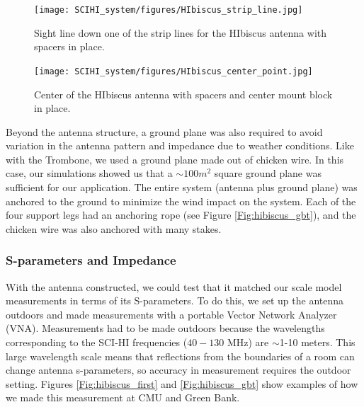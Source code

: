 \begin{figure}[htb]
\centering
\begin{minipage}[b]{0.52\textwidth}
\centering
\texttt{[image: SCIHI\_system/figures/HIbiscus\_strip\_line.jpg]}
\caption{Sight line down one of the strip lines for the HIbiscus antenna with spacers in place.}
\label{Fig:hibiscus_spacer}
\end{minipage}%
\begin{minipage}[b]{0.02\textwidth}
\hspace{1cm}
\end{minipage}%
\begin{minipage}[b]{0.42\textwidth}
\centering
\texttt{[image: SCIHI\_system/figures/HIbiscus\_center\_point.jpg]}
\caption{Center of the HIbiscus antenna with spacers and center mount block in place.}
\label{Fig:hibiscus_center}
\end{minipage}
\end{figure}

Beyond the antenna structure, a ground plane was also required to avoid variation in the antenna pattern and impedance due to weather conditions. Like with the Trombone, we used a ground plane made out of chicken wire. In this case, our simulations showed us that a $\sim 100 m^2$ square ground plane was sufficient for our application. The entire system (antenna plus ground plane) was anchored to the ground to minimize the wind impact on the system. Each of the four support legs had an anchoring rope (see Figure \ref{Fig:hibiscus_gbt}), and the chicken wire was also anchored with many stakes. 

\subsubsection{S-parameters and Impedance}\label{Sec:HIbiscus_Imp}

With the antenna constructed, we could test that it matched our scale model measurements in terms of its S-parameters. To do this, we set up the antenna outdoors and made measurements with a portable Vector Network Analyzer (VNA). Measurements had to be made outdoors because the wavelengths corresponding to the SCI-HI frequencies ($40-130$ MHz) are $\sim$1-10 meters. This large wavelength scale means that reflections from the boundaries of a room can change antenna s-parameters, so accuracy in measurement requires the outdoor setting. Figures \ref{Fig:hibiscus_first} and \ref{Fig:hibiscus_gbt} show examples of how we made this measurement at CMU and Green Bank.

